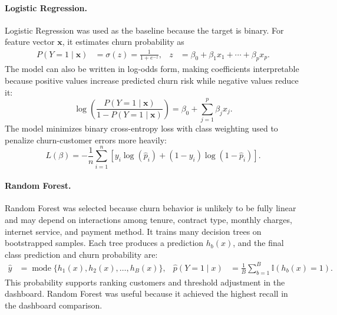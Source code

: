 \documentclass{article}
\begin{document}
\paragraph{Logistic Regression.} Logistic Regression was used as the baseline because the target is binary. For feature vector $\mathbf{x}$, it estimates churn probability as
\begin{equation}
\begin{aligned}
P(Y=1 \mid \mathbf{x}) &= \sigma(z)=\frac{1}{1+e^{-z}},
& z &= \beta_0+\beta_1x_1+\cdots+\beta_px_p.
\end{aligned}
\end{equation}
The model can also be written in log-odds form, making coefficients interpretable because positive values increase predicted churn risk while negative values reduce it:
\begin{equation}
\log\left(\frac{P(Y=1\mid \mathbf{x})}{1-P(Y=1\mid \mathbf{x})}\right)
=\beta_0+\sum_{j=1}^{p}\beta_jx_j.
\end{equation}
The model minimizes binary cross-entropy loss with class weighting used to penalize churn-customer errors more heavily:
\begin{equation}
L(\beta)=-\frac{1}{n}\sum_{i=1}^{n}
\left[y_i\log(\hat{p}_i)+(1-y_i)\log(1-\hat{p}_i)\right].
\end{equation}

\paragraph{Random Forest.} Random Forest was selected because churn behavior is unlikely to be fully linear and may depend on interactions among tenure, contract type, monthly charges, internet service, and payment method. It trains many decision trees on bootstrapped samples. Each tree produces a prediction $h_b(x)$, and the final class prediction and churn probability are:
\begin{equation}
\begin{aligned}
\hat{y} &= \operatorname{mode}\{h_1(x),h_2(x),\ldots,h_B(x)\},
& \hat{p}(Y=1\mid x) &= \frac{1}{B}\sum_{b=1}^{B}\mathbb{I}(h_b(x)=1).
\end{aligned}
\end{equation}
This probability supports ranking customers and threshold adjustment in the dashboard. Random Forest was useful because it achieved the highest recall in the dashboard comparison.
\end{document}
